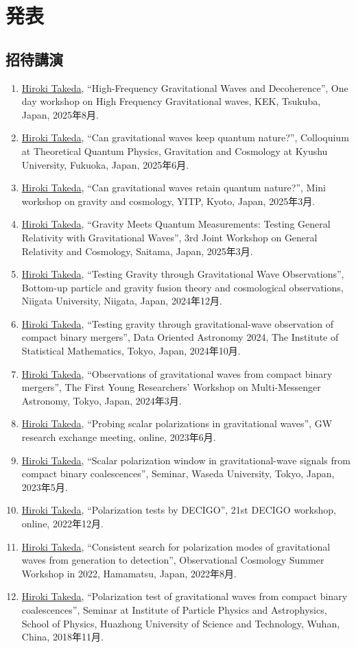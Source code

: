\documentclass[uplatex, 11pt]{jsarticle}
\begin{document}

\section*{発表}
\subsection*{招待講演}
\begin{enumerate}
\item \uline{Hiroki Takeda}, “High-Frequency Gravitational Waves and Decoherence”, One day workshop on High Frequency Gravitational waves, KEK, Tsukuba, Japan, 2025年8月.
\item \uline{Hiroki Takeda}, “Can gravitational waves keep quantum nature?”, Colloquium at Theoretical Quantum Physics, Gravitation and Cosmology at Kyushu University, Fukuoka, Japan, 2025年6月.
\item \uline{Hiroki Takeda}, “Can gravitational waves retain quantum nature?”, Mini workshop on gravity and cosmology, YITP, Kyoto, Japan, 2025年3月.
\item \uline{Hiroki Takeda}, “Gravity Meets Quantum Measurements: Testing General Relativity with Gravitational Waves”, 3rd Joint Workshop on General Relativity and Cosmology, Saitama, Japan, 2025年3月.
\item \uline{Hiroki Takeda}, “Testing Gravity through Gravitational Wave Observations”, Bottom-up particle and gravity fusion theory and cosmological observations, Niigata University, Niigata, Japan, 2024年12月.
\item \uline{Hiroki Takeda}, “Testing gravity through gravitational-wave observation of compact binary mergers”, Data Oriented Astronomy 2024, The Institute of Statistical Mathematics, Tokyo, Japan, 2024年10月.
\item \uline{Hiroki Takeda}, “Observations of gravitational waves from compact binary mergers”, The First Young Researchers' Workshop on Multi-Messenger Astronomy, Tokyo, Japan, 2024年3月.
\item \uline{Hiroki Takeda}, “Probing scalar polarizations in gravitational waves”, GW research exchange meeting, online, 2023年6月.
\item \uline{Hiroki Takeda}, “Scalar polarization window in gravitational-wave signals from compact binary coalescences”, Seminar, Waseda University, Tokyo, Japan, 2023年5月.
\item \uline{Hiroki Takeda}, “Polarization tests by DECIGO”, 21st DECIGO workshop, online, 2022年12月.
\item \uline{Hiroki Takeda}, “Consistent search for polarization modes of gravitational waves from generation to detection”, Observational Cosmology Summer Workshop in 2022, Hamamatsu, Japan, 2022年8月.
\item \uline{Hiroki Takeda}, “Polarization test of gravitational waves from compact binary coalescences”, Seminar at Institute of Particle Physics and Astrophysics, School of Physics, Huazhong University of Science and Technology, Wuhan, China, 2018年11月.
\end{enumerate}
\end{document}
